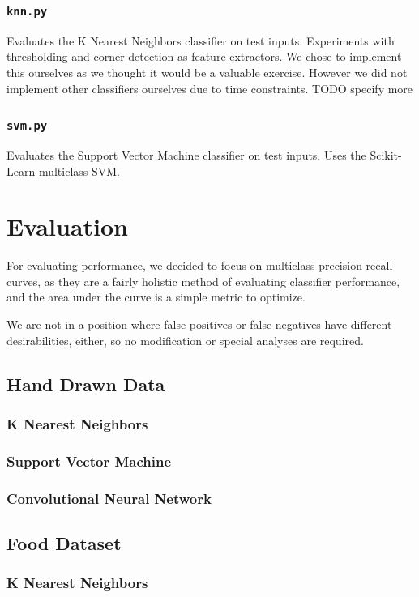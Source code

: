 \documentclass[leqno]{article}
\begin{document}
\subsubsection{\texttt{knn.py}}
Evaluates the K Nearest Neighbors classifier on test inputs. Experiments with
thresholding and corner detection as feature extractors. We chose to implement
this ourselves as we thought it would be a valuable exercise. However we did not
implement other classifiers ourselves due to time constraints.
TODO specify more
\subsubsection{\texttt{svm.py}}
Evaluates the Support Vector Machine classifier on test inputs. Uses the
Scikit-Learn multiclass SVM. 


\section{Evaluation}
For evaluating performance, we decided to focus on multiclass precision-recall
curves, as they are a fairly holistic method of evaluating classifier
performance, and the area under the curve is a simple metric to optimize.

We are not in a position where false positives or false negatives
have different desirabilities, either, so no modification or special analyses
are required.

\subsection{Hand Drawn Data}
\subsubsection{K Nearest Neighbors}
\subsubsection{Support Vector Machine}
\subsubsection{Convolutional Neural Network}

\subsection{Food Dataset}
\subsubsection{K Nearest Neighbors}
\end{document}
